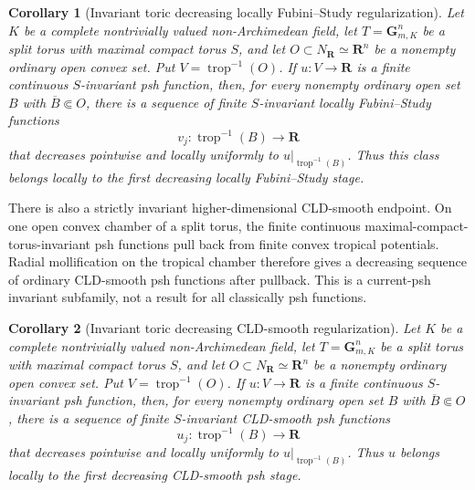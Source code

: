 \documentclass[11pt,a4paper]{article}
\newtheorem{corollary}[corollary]{Corollary}
\theoremstyle{definition}
\theoremstyle{remark}
\begin{document}
\begin{corollary}[Invariant toric decreasing locally Fubini--Study regularization]
\label{cor:p022-invariant-toric-lfs-regularization}
Let \(K\) be a complete nontrivially valued non-Archimedean field, let
\(T=\mathbf G_{m,K}^n\) be a split torus with maximal compact torus \(S\),
and let \(O\subset N_{\mathbf R}\simeq\mathbf R^n\) be a nonempty ordinary
open convex set.  Put \(V=\operatorname{trop}^{-1}(O)\).  If
\(u:V\to\mathbf R\) is a finite continuous \(S\)-invariant psh function,
then, for every nonempty ordinary open set \(B\) with \(\overline B\Subset O\),
there is a sequence of finite \(S\)-invariant locally Fubini--Study
functions
\[
                    v_j:\operatorname{trop}^{-1}(B)\longrightarrow\mathbf R
\]
that decreases pointwise and locally uniformly to
\(u|_{\operatorname{trop}^{-1}(B)}\).  Thus this class belongs locally to
the first decreasing locally Fubini--Study stage.
\end{corollary}




There is also a strictly invariant higher-dimensional CLD-smooth endpoint.
On one open convex chamber of a split torus, the finite continuous
maximal-compact-torus-invariant psh functions pull back from finite convex
tropical potentials.  Radial mollification on the tropical chamber therefore
gives a decreasing sequence of ordinary CLD-smooth psh functions after
pullback.  This is a current-psh invariant subfamily, not a result for all
classically psh functions.


\begin{corollary}[Invariant toric decreasing CLD-smooth regularization]
\label{cor:p024-invariant-toric-cld-smooth-regularization}
Let \(K\) be a complete nontrivially valued non-Archimedean field, let
\(T=\mathbf G_{m,K}^n\) be a split torus with maximal compact torus \(S\),
and let \(O\subset N_{\mathbf R}\simeq\mathbf R^n\) be a nonempty ordinary
open convex set.  Put \(V=\operatorname{trop}^{-1}(O)\).  If
\(u:V\to\mathbf R\) is a finite continuous \(S\)-invariant psh function,
then, for every nonempty ordinary open set \(B\) with \(\overline B\Subset O\),
there is a sequence of finite \(S\)-invariant CLD-smooth psh functions
\[
                    u_j:\operatorname{trop}^{-1}(B)\longrightarrow\mathbf R
\]
that decreases pointwise and locally uniformly to
\(u|_{\operatorname{trop}^{-1}(B)}\).  Thus \(u\) belongs locally to the
first decreasing CLD-smooth psh stage.
\end{corollary}
\end{document}
